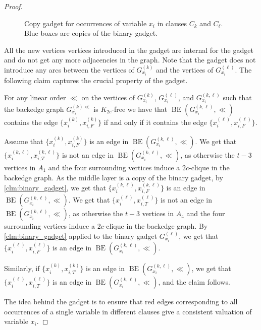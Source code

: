 \documentclass[a4paper,USenglish,cleveref,autoref,thm-restate,pdfa]{lipics-v2021}
\DeclareMathOperator{\backedge}{BE}
\begin{document}
\begin{proof}
\begin{figure}
\begin{center}
\begin{tiny}
\end{tiny}
\end{center}
\caption{\label{fig:copy_gadget} Copy gadget for occurrences of variable $x_i$ in clauses $C_k$ and $C_\ell$.
    Blue boxes are copies of the binary gadget.
    }
\end{figure}
    All the new vertices vertices introduced in the gadget are internal for the gadget and do not get any more adjacencies in the graph.
    Note that the gadget does not introduce any arcs between the vertices of $G_{x_i}^{(k)}$ and the vertices of $G_{x_i}^{(\ell)}$. 
    The following claim captures the crucial property of the gadget.
    \begin{claim}\label{clm:copy_gadget}
      For any linear order $\ll$ on the vertices of $G_{x_i}^{(k)}$, $G_{x_i}^{(\ell)}$, and $G_{x_i}^{(k,\ell)}$ such that the backedge graph $G_{x_i}^{(k)\ll}$ is $K_{2c}$-free we have
        that $\backedge(G_{x_i}^{(k,\ell)},\ll)$ contains the edge $\{x_i^{(k)},x_{i,F}^{(k)}\}$ if and only if it contains the edge $\{x_i^{(\ell)},x_{i,F}^{(\ell)}\}$.
\end{claim}
    \begin{claimproof}
        Assume that $\{x_i^{(k)},x_{i,F}^{(k)}\}$ is an edge in $\backedge(G_{x_i}^{(k,\ell)},\ll)$.
        We get that $\{x_i^{(k,\ell)},x_{i,T}^{(k,\ell)}\}$ is not an edge in $\backedge(G_{x_i}^{(k,\ell)},\ll)$,
        as otherwise the $t-3$ vertices in $A_1$ and the four surrounding vertices induce a $2c$-clique in the backedge graph.
        As the middle layer is a copy of the binary gadget, by \cref{clm:binary_gadget}, we get that $\{x_i^{(k,\ell)},x_{i,F}^{(k,\ell)}\}$ is an edge in $\backedge(G_{x_i}^{(k,\ell)},\ll)$.
        We get that $\{x_i^{(\ell)},x_{i,T}^{(\ell)}\}$ is not an edge in $\backedge(G_{x_i}^{(k,\ell)},\ll)$,
        as otherwise the $t-3$ vertices in $A_4$ and the four surrounding vertices induce a $2c$-clique in the backedge graph.
        By \cref{clm:binary_gadget} applied to the binary gadget $G_{x_i}^{(\ell)}$, we get that $\{x_i^{(\ell)},x_{i,F}^{(\ell)}\}$ is an edge in $\backedge(G_{x_i}^{(k,\ell)},\ll)$.

        Similarly, if $\{x_i^{(k)},x_{i,T}^{(k)}\}$ is an edge in $\backedge(G_{x_i}^{(k,\ell)},\ll)$, we get that $\{x_i^{(\ell)},x_{i,T}^{(\ell)}\}$ is an edge in $\backedge(G_{x_i}^{(k,\ell)},\ll)$,
        and the claim follows.
   \end{claimproof}
    
    The idea behind the gadget is to ensure that red edges corresponding to all occurrences of a single variable in different clauses give a consistent valuation of variable $x_i$.


\end{proof}
\end{document}
